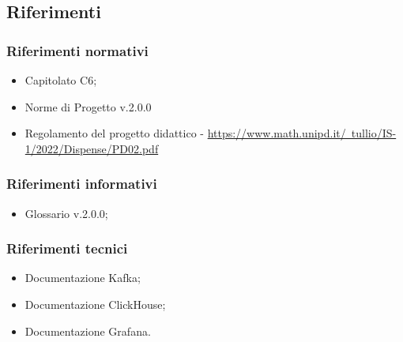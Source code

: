 \subsection{Riferimenti}
\subsubsection{Riferimenti normativi}
\begin{itemize}
    \item Capitolato C6;
    \item Norme di Progetto v.2.0.0
    \item  Regolamento del progetto didattico - \href{https://www.math.unipd.it/~tullio/IS-1/2022/Dispense/PD02.pdf}{https://www.math.unipd.it/~tullio/IS-1/2022/Dispense/PD02.pdf}
\end{itemize}
\subsubsection{Riferimenti informativi}
\begin{itemize}
    \item Glossario v.2.0.0;
\end{itemize}
\subsubsection{Riferimenti tecnici}
\begin{itemize}
    \item Documentazione Kafka;
    \item Documentazione ClickHouse;
    \item Documentazione Grafana.
\end{itemize} 
